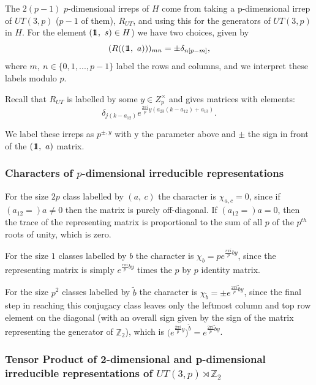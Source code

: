 \documentclass[12pt]{article}
\theoremstyle{definition}
\def\identity{{\rlap{1} \hskip 1.6pt \hbox{1}}}
\begin{document}
The $2(p-1)$ $p$-dimensional irreps of $H$ come from taking a p-dimensional irrep of $UT(3,p)$ ($p-1$ of them), $R_{UT}$, and using this for the generators of $UT(3,p)$ in $H$. For the element $(\identity,~s) \in H$) we have two choices, given by
\begin{equation}
(R((\identity,~a)))_{mn} = \pm \delta_{n[p-m]},
\end{equation}
where $m,~n \in \{0,1,...,p-1 \}$ label the rows and columns, and we interpret these labels modulo $p$.

Recall that $R_{UT}$ is labelled by some $y \in Z_p^{\times}$ and gives matrices with elements:
\begin{equation}
\delta_{j (k - a_{12})} e^{\frac{2 \pi i}{p} y (a_{23}(k-a_{12})+a_{13})}.
\end{equation}

We label these irreps as $p^{\pm,y}$ with y the parameter above and $\pm$ the sign in front of the $(\identity,~a)$ matrix.

\subsubsection*{Characters of $p$-dimensional irreducible representations}

For the size $2p$ class labelled by $(a,~c)$ the character is $\chi_{a,c} = 0$, since if $(a_{12} =)a \neq 0$ then the matrix is purely off-diagonal. If $(a_{12} =)a = 0$, then the trace of the representing matrix is proportional to the sum of all $p$ of the $p^{th}$ roots of unity, which is zero.

For the size $1$ classes labelled by $b$ the character is $\chi_b = pe^{\frac{r \pi i}{p} b y}$, since the representing matrix is simply $e^{\frac{r \pi i}{p} b y}$ times the $p$ by $p$ identity matrix.

For the size $p^2$ classes labelled by $\tilde{b}$ the character is $\chi_{\tilde{b}} = \pm e^{\frac{2 \pi i}{p} \tilde{b} y}$, since the final step in reaching this conjugacy class leaves only the leftmost column and top row element on the diagonal (with an overall sign given by the sign of the matrix representing the generator of $\mathbb{Z}_2$), which is $\big(e^{\frac{2 \pi i}{p} y}\big)^{\tilde{b}} = e^{\frac{2 \pi i}{p} \tilde{b} y}$.

\subsubsection*{Tensor Product of 2-dimensional and p-dimensional irreducible representations of $UT(3,p) \rtimes \mathbb{Z}_2$}
\end{document}
